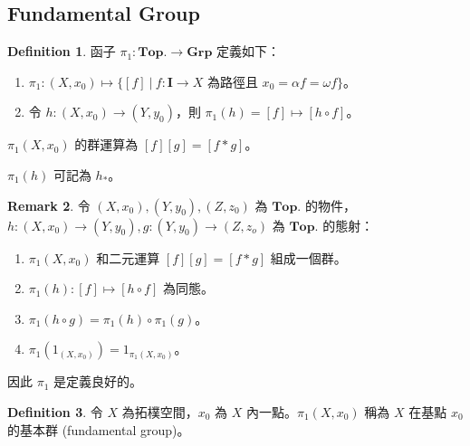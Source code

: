 \documentclass[12pt]{article}
\theoremstyle{definition}
\newtheorem{definition}{Definition}[section]
\newtheorem{remark}[definition]{Remark}
\newcommand\<{\langle}
\renewcommand\>{\rangle}
\begin{document}
\begin{CJK}{UTF8}{bsmi}
\section{Fundamental Group}

\begin{definition}
    函子 $\pi_1:\textbf{Top.}\to\textbf{Grp}$ 定義如下：
    \begin{enumerate}
        \item $\pi_1:(X, x_0)\mapsto\{[f]\ |\ f:\textbf{I}\to X\text{ 為路徑且 }x_0=\alpha f=\omega f\}$。
        \item 令 $h:(X, x_0)\to(Y, y_0)$，則 $\pi_1(h)=[f]\mapsto[h\circ f]$。
    \end{enumerate}
\end{definition}

$\pi_1(X, x_0)$ 的群運算為 $[f][g]=[f*g]$。

$\pi_1(h)$ 可記為 $h_*$。

\begin{remark}
\label{pi_1 is well-defined}
    令 $(X, x_0), (Y, y_0), (Z, z_0)$ 為 $\textbf{Top.}$ 的物件，$h:(X, x_0)\to (Y, y_0), g:(Y, y_0)\to(Z, z_o)$ 為 $\textbf{Top.}$ 的態射：
    \begin{enumerate}
        \item $\pi_1(X, x_0)$ 和二元運算 $[f][g]=[f*g]$ 組成一個群。
        \item $\pi_1(h):[f]\mapsto[h\circ f]$ 為同態。
        \item $\pi_1(h\circ g)=\pi_1(h)\circ\pi_1(g)$。
        \item $\pi_1(1_{(X, x_0)})=1_{\pi_1(X, x_0)}$。
    \end{enumerate}
\end{remark}

因此 $\pi_1$ 是定義良好的。

\begin{definition}
    令 $X$ 為拓樸空間，$x_0$ 為 $X$ 內一點。$\pi_1(X, x_0)$ 稱為 $X$ 在基點 $x_0$ 的基本群 (fundamental group)。
\end{definition}


\end{CJK}
\end{document}
